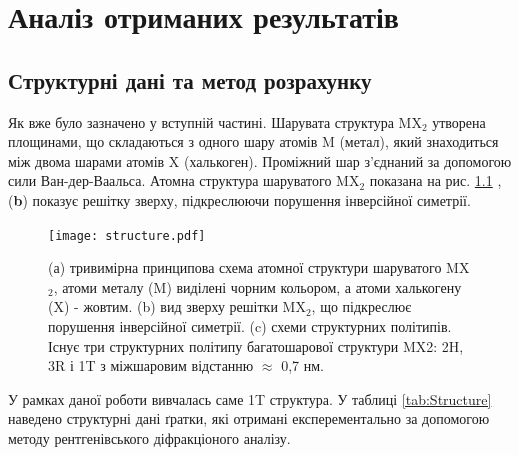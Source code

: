 \chapter{Аналіз отриманих результатів}
\section{Структурні дані та метод розрахунку}
Як вже було зазначено у вступній частині. Шарувата структура MX$_2$ утворена площинами, що складаються з одного шару атомів M (метал), який знаходиться між двома шарами атомів X (халькоген). Проміжний шар з'єднаний за допомогою сили Ван-дер-Ваальса. Атомна структура шаруватого MX$_2$ показана на рис. \ref{structure} \cite{FU2016221}, (\textbf{b}) показує решітку зверху, підкреслюючи порушення інверсійної симетрії. 

\begin{figure}
	\centering
	\texttt{[image: structure.pdf]}
	\caption{(а) тривимірна принципова схема атомної структури шаруватого MX$_2$, атоми металу (M) виділені чорним кольором, а атоми халькогену (X) - жовтим. (b) вид зверху решітки MX$_2$, що підкреслює порушення інверсійної симетрії. (c) схеми структурних політипів. Існує три структурних політипу багатошарової структури MX2: 2H, 3R і 1T з міжшаровим відстанню $\approx$ 0,7 нм.}
	\label{structure}
\end{figure}

У рамках даної роботи вивчалась саме 1T структура. У таблиці \ref{tab:Structure} наведено структурні дані ґратки, які отримані експерементально за допомогою методу рентгенівського діфракціоного аналізу.


